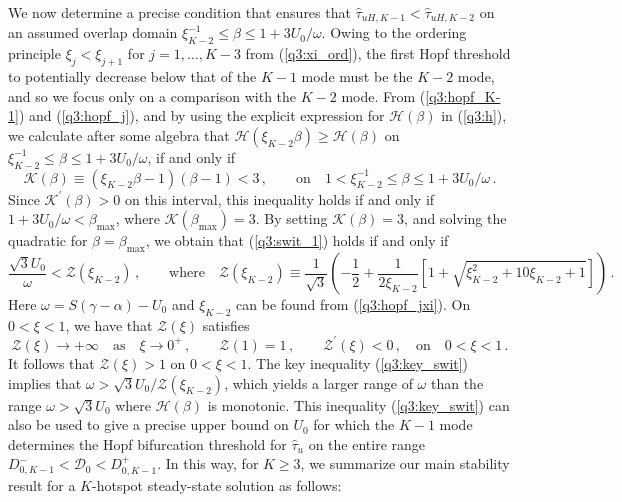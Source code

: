 \documentclass{article}%
\begin{document}
We now determine a precise condition that ensures that
$\hat{\tau}_{uH,K-1}<\hat{\tau}_{uH,K-2}$ on an assumed overlap domain
$\xi_{K-2}^{-1}\leq \beta \leq 1+{3U_0/\omega}$. Owing to the ordering
principle $\xi_{j}<\xi_{j+1}$ for $j=1,\ldots,K-3$ from
(\ref{q3:xi_ord}), the first Hopf threshold to potentially decrease
below that of the $K-1$ mode must be the $K-2$ mode, and so we focus
only on a comparison with the $K-2$ mode. From (\ref{q3:hopf_K-1}) and
(\ref{q3:hopf_j}), and by using the explicit expression for ${\mathcal
  H}(\beta)$ in (\ref{q3:h}), we calculate after some algebra that
${\mathcal H}(\xi_{K-2}\beta)\geq {\mathcal H}(\beta)$ on
$\xi_{K-2}^{-1}\leq \beta\leq 1+{3U_0/\omega}$, if and only if
\begin{equation}\label{q3:swit_1}
   {\mathcal K}(\beta) \equiv \left(\xi_{K-2}\beta -1\right)(\beta-1)<3
\,, \qquad \mbox{on} \quad 1<\xi_{K-2}^{-1}\leq \beta\leq 1+{3U_0/\omega}\,.
\end{equation}
Since ${\mathcal K}^{\prime}(\beta)>0$ on this interval, this inequality
holds if and only if $1+{3U_0/\omega}<\beta_{\max}$, where
${\mathcal  K}(\beta_{\max})=3$. By setting ${\mathcal K}(\beta)=3$, and
solving the quadratic for $\beta=\beta_{\max}$,
we obtain that (\ref{q3:swit_1}) holds if and only if
\begin{equation}\label{q3:key_swit}
     \frac{\sqrt{3}U_0}{\omega} < {\mathcal Z}(\xi_{K-2}) \,, \qquad
     \mbox{where} \quad {\mathcal Z}(\xi_{K-2}) \equiv
     \frac{1}{\sqrt{3}} \left( -\frac{1}{2} + \frac{1}{2\xi_{K-2}}
       \left[1 + \sqrt{\xi^2_{K-2}+10 \xi_{K-2}+1} \right] \right) \,.
\end{equation}
Here $\omega=S(\gamma-\alpha)-U_0$ and $\xi_{K-2}$ can be found from
(\ref{q3:hopf_jxi}). On $0<\xi<1$, we have that ${\mathcal Z}(\xi)$ 
satisfies
\begin{equation}\label{q:zprop}
   {\mathcal Z}(\xi)\to +\infty \quad \mbox{as} \quad \xi\to 0^{+} \,,
\qquad {\mathcal Z}(1)=1\,, \qquad {\mathcal Z}^{\prime}(\xi)<0 \,, \quad
  \mbox{on} \quad 0<\xi<1 \,.
\end{equation}
It follows that ${\mathcal Z}(\xi)>1$ on $0<\xi<1$. The key inequality
(\ref{q3:key_swit}) implies that $\omega>{\sqrt{3}U_0/{\mathcal
    Z}(\xi_{K-2})}$, which yields a larger range of $\omega$ than the
range $\omega>\sqrt{3}U_0$ where ${\mathcal H}(\beta)$ is monotonic.
This inequality (\ref{q3:key_swit}) can also be used to give a precise
upper bound on $U_0$ for which the $K-1$ mode determines the Hopf
bifurcation threshold for $\hat{\tau}_u$ on the entire range
$D^{-}_{0,K-1}<{\mathcal D}_0<D^{+}_{0,K-1}$. In this way, for $K\geq 3$,
we summarize our main stability result for a $K$-hotspot steady-state 
solution as follows:
\end{document}

